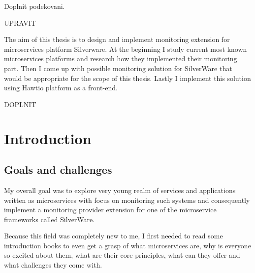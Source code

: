 \documentclass[12pt,oneside]{fithesis2}
\begin{document}
  \FrontMatter                    %
    \ThesisTitlePage                %
    \begin{ThesisDeclaration}       %
      \DeclarationText
      \AdvisorName
    \end{ThesisDeclaration}
    \begin{ThesisThanks}            %
      Doplnit podekovani.
    \end{ThesisThanks}
    \begin{ThesisAbstract}          %
    
    
    UPRAVIT 

    
The aim of this thesis is to design and implement monitoring extension for microservices platform Silverware. At the beginning I study current most known microservices platforms and research how they implemented their monitoring part. Then I come up with possible monitoring solution for SilverWare that would be appropriate for the scope of this thesis. Lastly I implement this solution using Hawtio platform as a front-end.
    \end{ThesisAbstract}
    \begin{ThesisKeyWords}          %
      DOPLNIT
    \end{ThesisKeyWords}
    \tableofcontents                %
  
  \MainMatter                     %
\chapter{Introduction}

\section{Goals and challenges}

My overall goal was to explore very young realm of services and applications written as microservices with focus on monitoring such systems and consequently implement a monitoring provider extension for one of the microservice frameworks called SilverWare.

Because this field was completely new to me, I first needed to read some introduction books to even get a grasp of what microservices are, why is everyone so excited about them, what are their core principles, what can they offer and what challenges they come with.
\end{document}
